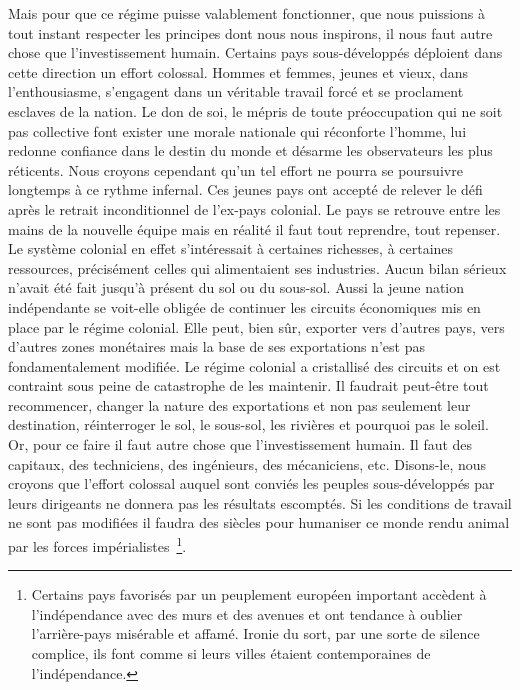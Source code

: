 \documentclass[french,twoside]{book} %
\begin{document}
Mais pour que ce régime puisse valablement fonctionner, que nous puissions à tout instant respecter les principes dont nous nous inspirons, il nous faut autre chose que l’investissement humain. Certains pays sous-développés déploient dans cette direction un effort colossal. Hommes et femmes, jeunes et vieux, dans l’enthousiasme, s’engagent dans un véritable travail forcé et se proclament esclaves de la nation. Le don de soi, le mépris de toute préoccupation qui ne soit pas collective font exister une morale nationale qui réconforte l’homme, lui redonne confiance dans le destin du monde et désarme les observateurs les plus réticents. Nous croyons cependant qu’un tel effort ne pourra se poursuivre longtemps à ce rythme infernal. Ces jeunes pays ont accepté de relever le défi après le retrait inconditionnel de l’ex-pays colonial. Le pays se retrouve entre les mains de la nouvelle équipe mais en réalité il faut tout reprendre, tout repenser. Le système colonial en effet s’intéressait à certaines richesses, à certaines ressources, précisément celles qui alimentaient ses industries. Aucun bilan sérieux n’avait été fait jusqu’à présent du sol ou du sous-sol. Aussi la jeune nation indépendante se voit-elle obligée de continuer les circuits économiques mis en place par le régime colonial. Elle peut, bien sûr, exporter vers d’autres pays, vers d’autres zones monétaires mais la base de ses exportations n’est pas fondamentalement modifiée. Le régime colonial a cristallisé des circuits et on est contraint sous peine de catastrophe de les maintenir. Il faudrait peut-être tout recommencer, changer la nature des exportations et non pas seulement leur destination, réinterroger le sol, le sous-sol, les rivières et pourquoi pas le soleil. Or, pour ce faire il faut autre chose que l’investissement   humain. Il faut des capitaux, des techniciens, des ingénieurs, des mécaniciens, etc. Disons-le, nous croyons que l’effort colossal auquel sont conviés les peuples sous-développés par leurs dirigeants ne donnera pas les résultats escomptés. Si les conditions de travail ne sont pas modifiées il faudra des siècles pour humaniser ce monde rendu animal par les forces impérialistes \footnote{Certains pays favorisés par un peuplement européen important accèdent à l’indépendance avec des murs et des avenues et ont tendance à oublier l’arrière-pays misérable et affamé. Ironie du sort, par une sorte de silence complice, ils font comme si leurs villes étaient contemporaines de l’indépendance.}.\par
\bigbreak
\end{document}
